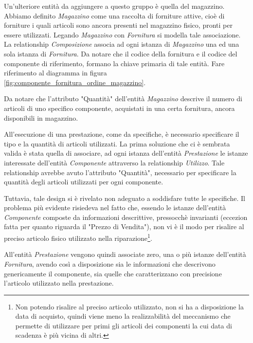 			Un'ulteriore entità da aggiungere a questo gruppo è quella del magazzino. Abbiamo definito \emph{Magazzino} come una raccolta di forniture attive, cioè di forniture i quali articoli sono ancora presenti nel magazzino fisico, pronti per essere utilizzati. Legando \emph{Magazzino} con \emph{Fornitura} si modella tale associazione. La relationship \emph{Composizione} associa ad ogni istanza di \emph{Magazzino} una ed una sola istanza di \emph{Fornitura}. Da notare che il codice della fornitura e il codice del componente di riferimento, formano la chiave primaria di tale entità.
			Fare riferimento al diagramma in figura \ref{fig:componente_fornitura_ordine_magazzino}.
			
			Da notare che l'attributo "Quantità" dell'entità \emph{Magazzino} descrive il numero di articoli di uno specifico componente, acquistati in una certa fornitura, ancora disponibili in magazzino.
			
			All'esecuzione di una prestazione, come da specifiche, è necessario specificare il tipo e la quantità di articoli utilizzati. La prima soluzione che ci è sembrata valida è stata quella di associare, ad ogni istanza dell'entità \emph{Prestazione} le istanze interessate dell'entità \emph{Componente} attraverso la relationship \emph{Utilizzo}. Tale relationship avrebbe avuto l'attributo "Quantità", necessario per specificare la quantità degli articoli utilizzati per ogni componente.
			
			Tuttavia, tale design si è rivelato non adeguato a soddisfare tutte le specifiche. Il problema più evidente risiedeva nel fatto che, essendo le istanze dell'entità \emph{Componente} composte da informazioni descrittive, pressocchè invarianti (eccezion fatta per quanto riguarda il "Prezzo di Vendita"), non vi è il modo per risalire al preciso articolo fisico utilizzato nella riparazione\footnote{Non potendo risalire al preciso articolo utilizzato, non si ha a disposizione la data di acquisto, quindi viene meno la realizzabilità del meccanismo che permette di utilizzare per primi gli articoli dei componenti la cui data di scadenza è più vicina di altri.}.
			
			All'entità \emph{Prestazione} vengono quindi associate zero, una o più istanze dell'entità \emph{Fornitura}, avendo così a disposizione sia le informazioni che descrivono genericamente il componente, sia quelle che caratterizzano con precisione l'articolo utilizzato nella prestazione. 

